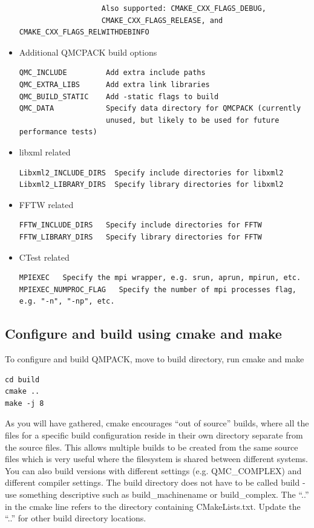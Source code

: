 \begin{itemize}
\begin{verbatim}
                   Also supported: CMAKE_CXX_FLAGS_DEBUG,
                   CMAKE_CXX_FLAGS_RELEASE, and CMAKE_CXX_FLAGS_RELWITHDEBINFO
\end{verbatim}
\item Additional QMCPACK build options
\begin{verbatim}
QMC_INCLUDE         Add extra include paths
QMC_EXTRA_LIBS      Add extra link libraries
QMC_BUILD_STATIC    Add -static flags to build
QMC_DATA            Specify data directory for QMCPACK (currently
                    unused, but likely to be used for future performance tests)
\end{verbatim}
\item libxml related
\begin{verbatim}
Libxml2_INCLUDE_DIRS  Specify include directories for libxml2
Libxml2_LIBRARY_DIRS  Specify library directories for libxml2
\end{verbatim}
 \item FFTW related
\begin{verbatim}
FFTW_INCLUDE_DIRS   Specify include directories for FFTW
FFTW_LIBRARY_DIRS   Specify library directories for FFTW
\end{verbatim}
 \item CTest related
\begin{verbatim}
MPIEXEC   Specify the mpi wrapper, e.g. srun, aprun, mpirun, etc.
MPIEXEC_NUMPROC_FLAG   Specify the number of mpi processes flag, e.g. "-n", "-np", etc.

\end{verbatim}
\end{itemize}

\subsection{Configure and build using cmake and make}
To configure and build QMPACK, move to build directory, run cmake and make
\begin{verbatim}
cd build
cmake ..
make -j 8
\end{verbatim}

As you will have gathered, cmake encourages ``out of source'' builds,
where all the files for a specific build configuration reside in their
own directory separate from the source files. This allows multiple
builds to be created from the same source files which is very useful
where the filesystem is shared between different systems. You can also
build versions with different settings (e.g. QMC\_COMPLEX) and
different compiler settings. The build directory does not have to be
called build - use something descriptive such as build\_machinename or
build\_complex. The ``..'' in the cmake line refers to the directory
containing CMakeLists.txt. Update the ``..'' for other build
directory locations.

